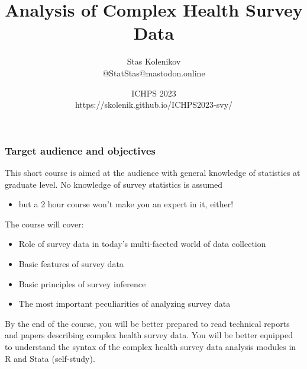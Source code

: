 \documentclass{beamer}
\begin{document}
\title{\textbf{Analysis of Complex Health Survey Data}}
\author[Stas Kolenikov]{Stas Kolenikov \\ @StatStas@mastodon.online}
\date[ICHPS 2023]{ICHPS 2023
 \medskip \\ https://skolenik.github.io/ICHPS2023-svy/ }




\begin{frame}
    \titlepage
\end{frame}

\begin{frame}\frametitle{Target audience and objectives}

This short course is aimed at the audience with general knowledge of statistics
at graduate level. No knowledge of survey statistics is assumed
\begin{itemize}
    \item but a 2 hour course won't make you an expert in it, either!
\end{itemize}

The course will cover:
\begin{itemize}
    \item Role of survey data in today's multi-faceted world of data collection
    \item Basic features of survey data
    \item Basic principles of survey inference
    \item The most important peculiarities of analyzing survey data
\end{itemize}

By the end of the course, you will be better prepared to read technical reports
and papers describing complex health survey data. You will be better equipped to
understand the syntax of the complex health survey data analysis modules
in R and Stata (self-study).

\end{frame}
\end{document}
